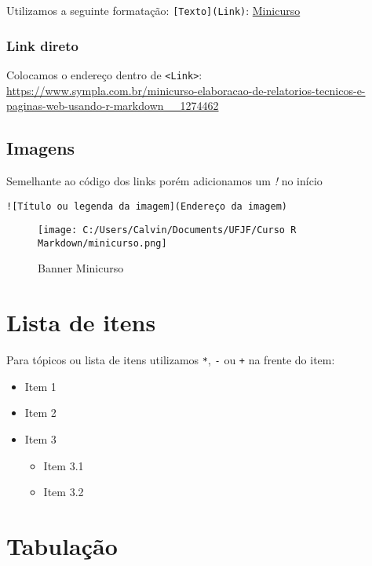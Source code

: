 \documentclass[
]{article}
\providecommand{\tightlist}{%
  \setlength{\itemsep}{0pt}\setlength{\parskip}{0pt}}
\begin{document}
Utilizamos a seguinte formatação: \texttt{{[}Texto{]}(Link)}:
\href{https://www.sympla.com.br/minicurso-elaboracao-de-relatorios-tecnicos-e-paginas-web-usando-r-markdown__1274462}{Minicurso}

\subsubsection{Link direto}\label{link-direto}

Colocamos o endereço dentro de \texttt{\textless{}Link\textgreater{}}:\\
\url{https://www.sympla.com.br/minicurso-elaboracao-de-relatorios-tecnicos-e-paginas-web-usando-r-markdown__1274462}

\subsection{Imagens}\label{imagens}

Semelhante ao código dos links porém adicionamos um \emph{!} no início

\texttt{!{[}Título\ ou\ legenda\ da\ imagem{]}(Endereço\ da\ imagem)}

\begin{figure}
\centering
\texttt{[image: C:/Users/Calvin/Documents/UFJF/Curso R Markdown/minicurso.png]}
\caption{Banner Minicurso}
\end{figure}

\section{Lista de itens}\label{lista-de-itens}

Para tópicos ou lista de itens utilizamos \texttt{*}, \texttt{-} ou
\texttt{+} na frente do item:

\begin{itemize}
\tightlist
\item
  Item 1
\item
  Item 2
\item
  Item 3

  \begin{itemize}
  \tightlist
  \item
    Item 3.1
  \item
    Item 3.2
  \end{itemize}
\end{itemize}

\section{Tabulação}\label{tabulauxe7uxe3o}
\end{document}
